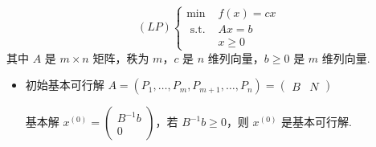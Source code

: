 \begin{remark}
    \[(L P)\left\{\begin{array}{lc}
        \min & f(x)=c x \\
        \text { s.t. } & A x=b \\
        & x \geq 0
    \end{array}\right.\]
    其中 $A$ 是 $m \times n$ 矩阵，秩为 $m$，$c$ 是 $n$ 维列向量，$b\ge 0$ 是 $m$ 维列向量.
    \begin{itemize}
        \item 初始基本可行解
            $A = (P_1, \dots, P_m, P_{m + 1}, \dots, P_n) = \begin{pmatrix}
                B & N
            \end{pmatrix}$

            基本解 $x^{(0)} = \begin{pmatrix}
                B^{-1}b \\
                0
            \end{pmatrix}$，若 $B^{-1}b \ge 0$，则 $x^{(0)}$ 是基本可行解.


\end{itemize}
\end{remark}
